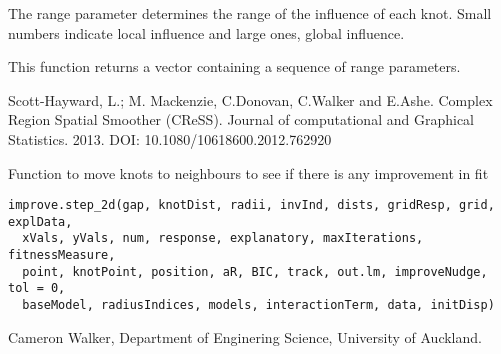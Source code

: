 \documentclass[a4paper]{book}
\begin{document}
%
\begin{Details}\relax
The range parameter determines the range of the influence of each knot.  Small numbers indicate local influence and large ones, global influence.
\end{Details}
%
\begin{Value}
This function returns a vector containing a sequence of range parameters.
\end{Value}
%
\begin{References}\relax
Scott-Hayward, L.; M. Mackenzie, C.Donovan, C.Walker and E.Ashe.  Complex Region Spatial Smoother (CReSS). Journal of computational and Graphical Statistics. 2013. 
DOI: 10.1080/10618600.2012.762920
\end{References}
%
\begin{Examples}
\end{Examples}
%
\begin{Description}\relax
Function to move knots to neighbours to see if there is any improvement in fit
\end{Description}
%
\begin{Usage}
\begin{verbatim}
improve.step_2d(gap, knotDist, radii, invInd, dists, gridResp, grid, explData,
  xVals, yVals, num, response, explanatory, maxIterations, fitnessMeasure,
  point, knotPoint, position, aR, BIC, track, out.lm, improveNudge, tol = 0,
  baseModel, radiusIndices, models, interactionTerm, data, initDisp)
\end{verbatim}
\end{Usage}
%
\begin{Author}\relax
Cameron Walker, Department of Enginering Science, University of Auckland.
\end{Author}
\end{document}
